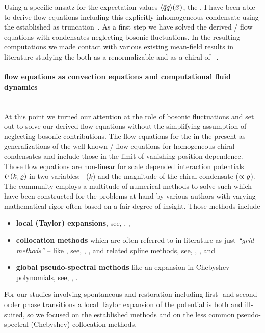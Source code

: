 Using a specific ansatz for the expectation values $\langle \bar{q} q \rangle(\vec{x}\mskip1.0mu)$, \viz{} the \cdw{}, I have been able to derive \frg{} flow equations including this explicitly inhomogeneous condensate using the established \lpa{} as truncation~\cite{Steil:2023RGMF}.
As a first step we have solved the derived \frg{}/\lpa{} flow equations with \cdw{} condensates neglecting bosonic fluctuations.
In the resulting \rgct{} \mf{} computations we made contact with various existing mean-field results in literature studying the \qmm{} both as a renormalizable \qft{} and as a chiral \loeft{} of \qcd{}~\cite{Steil:2023RGMF}.

\paragraph{\frg{} flow equations as convection equations and computational fluid dynamics}\label{paragraph:introFRGCFD}\mbox{}\\%
At this point we turned our attention at the role of bosonic fluctuations and set out to solve our derived flow equations without the simplifying assumption of neglecting bosonic contributions.
The flow equations for the \cdw{} in the \qmm{} present as generalizations of the well known \frg{}/\lpa{} flow equations for homogeneous chiral condensates and include those in the limit of vanishing position-dependence. 
Those flow equations are non-linear \pdes{} for scale depended interaction potentials $U(k,\varrho)$ in two variables: \rgscale{}~($k$) and the magnitude of the chiral condensate ($\propto\varrho$).
The \frg{} community employs a multitude of numerical methods to solve such \pdes{} which have been constructed for the problems at hand by various authors with varying mathematical rigor \dash{} often based on a fair degree of \aposteriori{} insight.
Those methods include 
\begin{itemize}
	\item \textbf{local (Taylor) expansions}, see, \eg{}, \ccite{\frgTaylorReferences},
	\item \textbf{collocation methods} \dash{} which are often referred to in \frg{} literature as just \textit{``grid methods''} \nolinebreak[3]-- like \fd{}, see, \eg{}, \ccite{\frgFDReferences}, and related spline methods, see, \eg{}, \ccite{\frgSplineReferences}, and
	\item \textbf{global pseudo-spectral methods} like an expansion in Chebyshev polynomials, see, \eg{}, \ccite{\frgChebyshevReferences}. 
\end{itemize}
For our studies involving spontaneous \csb{} and restoration including first- and second-order phase transitions a local Taylor expansion of the potential is both \apriori{} and \aposteriori{} ill-suited, so we focused on the established \fd{} methods and on the less common pseudo-spectral (Chebyshev) collocation methods.


